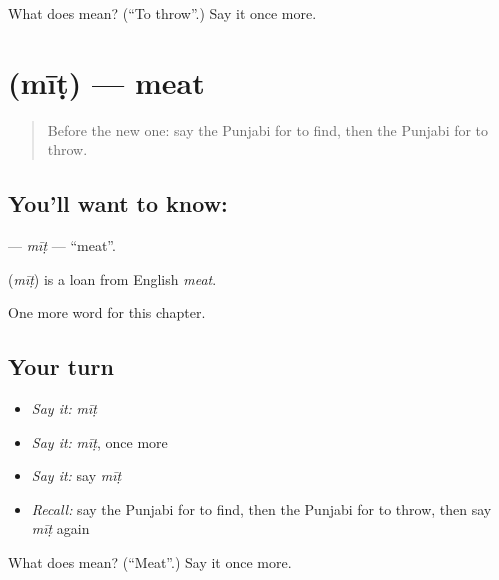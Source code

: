 \begin{tcolorbox}[breakable,colback=teal!4,colframe=teal!35!black,title={Before you move on}]
What does  mean? (\textquotedblleft{}To throw\textquotedblright{}.) Say it once more.
\end{tcolorbox}
\section[\texorpdfstring{\pa{ਮੀਟ} (mīṭ)}{ਮੀਟ (mīṭ)}]{ (mīṭ) — meat}

\label{lesson:PA-C63-mit}



\begin{quote}
Before the new one: say the Punjabi for to find, then the Punjabi for to throw.
\end{quote}

\subsection*{You'll want to know: }
\textbf{} — \emph{mīṭ} — \textquotedblleft{}meat\textquotedblright{}.

\begin{cousinweb}
\textbf{} (\emph{mīṭ}) is a loan from English \emph{meat}.
\end{cousinweb}

\begin{grammarlens}[title={What you've built}]
One more word for this chapter.
\end{grammarlens}

\subsection*{Your turn}
\begin{itemize}
\raggedright
  \item \emph{Say it:} \emph{mīṭ}
  \item \emph{Say it:} \emph{mīṭ}, once more
  \item \emph{Say it:} say \emph{mīṭ}
  \item \emph{Recall:} say the Punjabi for to find, then the Punjabi for to throw, then say \emph{mīṭ} again
\end{itemize}

\begin{tcolorbox}[breakable,colback=teal!4,colframe=teal!35!black,title={Before you move on}]
What does  mean? (\textquotedblleft{}Meat\textquotedblright{}.) Say it once more.
\end{tcolorbox}
